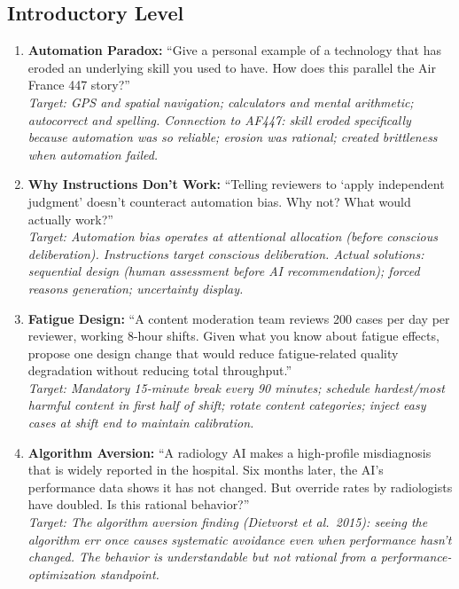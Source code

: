 \subsection{Introductory Level}

\begin{enumerate}
    \item \textbf{Automation Paradox:} ``Give a personal example of a technology that has eroded an underlying skill you used to have. How does this parallel the Air France 447 story?''\\
    \textit{Target: GPS and spatial navigation; calculators and mental arithmetic; autocorrect and spelling. Connection to AF447: skill eroded specifically because automation was so reliable; erosion was rational; created brittleness when automation failed.}

    \item \textbf{Why Instructions Don't Work:} ``Telling reviewers to `apply independent judgment' doesn't counteract automation bias. Why not? What would actually work?''\\
    \textit{Target: Automation bias operates at attentional allocation (before conscious deliberation). Instructions target conscious deliberation. Actual solutions: sequential design (human assessment before AI recommendation); forced reasons generation; uncertainty display.}

    \item \textbf{Fatigue Design:} ``A content moderation team reviews 200 cases per day per reviewer, working 8-hour shifts. Given what you know about fatigue effects, propose one design change that would reduce fatigue-related quality degradation without reducing total throughput.''\\
    \textit{Target: Mandatory 15-minute break every 90 minutes; schedule hardest/most harmful content in first half of shift; rotate content categories; inject easy cases at shift end to maintain calibration.}

    \item \textbf{Algorithm Aversion:} ``A radiology AI makes a high-profile misdiagnosis that is widely reported in the hospital. Six months later, the AI's performance data shows it has not changed. But override rates by radiologists have doubled. Is this rational behavior?''\\
    \textit{Target: The algorithm aversion finding (Dietvorst et al.\ 2015): seeing the algorithm err once causes systematic avoidance even when performance hasn't changed. The behavior is understandable but not rational from a performance-optimization standpoint.}
\end{enumerate}

